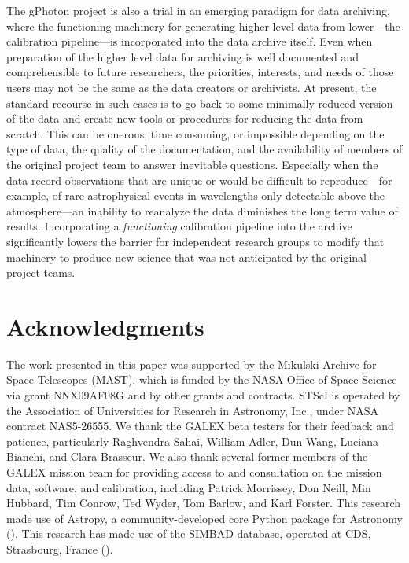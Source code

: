 \documentclass[preprint]{aastex}
\begin{document}
The gPhoton project is also a trial in an emerging paradigm for data archiving, where the functioning machinery for generating higher level data from lower---the calibration pipeline---is incorporated into the data archive itself. Even when preparation of the higher level data for archiving is well documented and comprehensible to future researchers, the priorities, interests, and needs of those users may not be the same as the data creators or archivists. At present, the standard recourse in such cases is to go back to some minimally reduced version of the data and create new tools or procedures for reducing the data from scratch. This can be onerous, time consuming, or impossible depending on the type of data, the quality of the documentation, and the availability of members of the original project team to answer inevitable questions. Especially when the data record observations that are unique or would be difficult to reproduce---for example, of rare astrophysical events in wavelengths only detectable above the atmosphere---an inability to reanalyze the data diminishes the long term value of results. Incorporating a \emph{functioning} calibration pipeline into the archive significantly lowers the barrier for independent research groups to modify that machinery to produce new science that was not anticipated by the original project teams.

\section{Acknowledgments}
The work presented in this paper was supported by the Mikulski Archive for Space Telescopes (MAST), which is funded by the NASA Office of Space Science via grant NNX09AF08G and by other grants and contracts. STScI is operated by the Association of Universities for Research in Astronomy, Inc., under NASA contract NAS5-26555.  We thank the GALEX beta testers for their feedback and patience, particularly Raghvendra Sahai, William Adler, Dun Wang, Luciana Bianchi, and Clara Brasseur.  We also thank several former members of the GALEX mission team for providing access to and consultation on the mission data, software, and calibration, including Patrick Morrissey, Don Neill, Min Hubbard, Tim Conrow, Ted Wyder, Tom Barlow, and Karl Forster.  This research made use of Astropy, a community-developed core Python package for Astronomy (\cite{astropy}). This research has made use of the SIMBAD database, operated at CDS, Strasbourg, France (\cite{simbad}).


\end{document}
